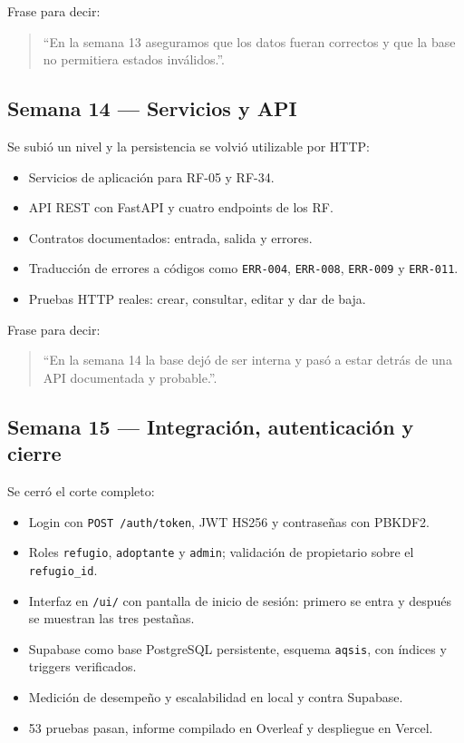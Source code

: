 \documentclass[11pt,a4paper]{article}
\newcommand{\code}[1]{\texttt{#1}}
\begin{document}
Frase para decir:

\begin{quote}
  ``En la semana 13 aseguramos que los datos fueran correctos y que la base no
  permitiera estados inválidos.''.
\end{quote}

\subsection{Semana 14 --- Servicios y API}

Se subió un nivel y la persistencia se volvió utilizable por HTTP:

\begin{itemize}[leftmargin=*]
  \item Servicios de aplicación para RF-05 y RF-34.
  \item API REST con FastAPI y cuatro endpoints de los RF.
  \item Contratos documentados: entrada, salida y errores.
  \item Traducción de errores a códigos como \code{ERR-004}, \code{ERR-008},
    \code{ERR-009} y \code{ERR-011}.
  \item Pruebas HTTP reales: crear, consultar, editar y dar de baja.
\end{itemize}

Frase para decir:

\begin{quote}
  ``En la semana 14 la base dejó de ser interna y pasó a estar detrás de una API
  documentada y probable.''.
\end{quote}

\subsection{Semana 15 --- Integración, autenticación y cierre}

Se cerró el corte completo:

\begin{itemize}[leftmargin=*]
  \item Login con \code{POST /auth/token}, JWT HS256 y contraseñas con PBKDF2.
  \item Roles \code{refugio}, \code{adoptante} y \code{admin}; validación de
    propietario sobre el \code{refugio\_id}.
  \item Interfaz en \code{/ui/} con pantalla de inicio de sesión: primero se
    entra y después se muestran las tres pestañas.
  \item Supabase como base PostgreSQL persistente, esquema \code{aqsis}, con
    índices y triggers verificados.
  \item Medición de desempeño y escalabilidad en local y contra Supabase.
  \item 53 pruebas pasan, informe compilado en Overleaf y despliegue en Vercel.
\end{itemize}
\end{document}

